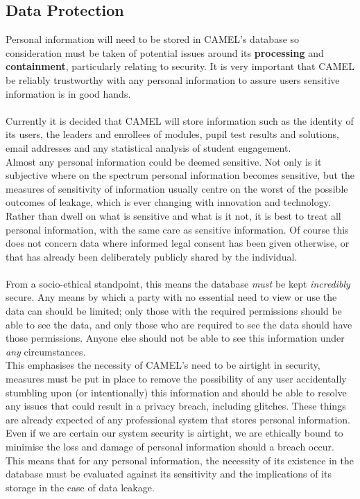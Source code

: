 \subsection*{Data Protection}
Personal information will need to be stored in CAMEL's database so consideration must be taken of potential issues around its \textbf{processing} and \textbf{containment}, particularly relating to security. It is very important that CAMEL be reliably trustworthy with any personal information to assure users sensitive information is in good hands.\\\\
Currently it is decided that CAMEL will store information such as the identity of its users, the leaders and enrollees of modules, pupil test results and solutions, email addresses and any statistical analysis of student engagement.\\
Almost any personal information could be deemed sensitive. Not only is it subjective where on the spectrum personal information becomes sensitive, but the measures of sensitivity of information usually centre on the worst of the possible outcomes of leakage, which is ever changing with innovation and technology. Rather than dwell on what is sensitive and what is it not, it is best to treat all personal information, with the same care as sensitive information. Of course this does not concern data where informed legal consent has been given otherwise, or that has already been deliberately publicly shared by the individual.\\\\
From a socio-ethical standpoint, this means the database \emph{must} be kept \emph{incredibly} secure. Any means by which a party with no essential need to view or use the data can should be limited; only those with the required permissions should be able to see the data, and only those who are required to see the data should have those permissions. Anyone else should not be able to see this information under \emph{any} circumstances.
\\This emphasises the necessity of CAMEL’s need to be airtight in security, measures must be put in place to remove the possibility of any user accidentally stumbling upon (or intentionally) this information and should be able to resolve any issues that could result in a privacy breach, including glitches. These things are already expected of any professional system that stores personal information.\\
Even if we are certain our system security is airtight, we are ethically bound to minimise the loss and damage of personal information should a breach occur. This means that for any personal information, the necessity of its existence in the database must be evaluated against its sensitivity and the implications of its storage in the case of data leakage.\\\\
